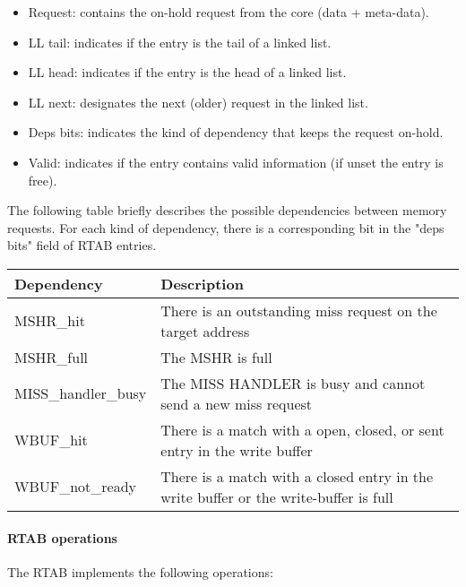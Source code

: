 \documentclass[10pt,titlepage,twoside]{book}
\begin{document}
\begin{itemize}
\item Request: contains the on-hold request from the core (data + meta-data).
\item LL tail: indicates if the entry is the tail of a linked list.
\item LL head: indicates if the entry is the head of a linked list.
\item LL next: designates the next (older) request in the linked list.
\item Deps bits: indicates the kind of dependency that keeps the request on-hold.
\item Valid: indicates if the entry contains valid information (if unset the entry is free).
\end{itemize}

The following table briefly describes the possible dependencies between memory requests.
For each kind of dependency, there is a corresponding bit in the "deps bits" field of \ac{RTAB} entries.

\begin{tabular}{p{.30\linewidth}p{.70\linewidth}}
  \toprule%
  \bf Dependency
  & \bf Description \\
  \midrule%
  MSHR\_hit
  & There is an outstanding miss request on the target address \\
  \midrule%
  MSHR\_full
  & The MSHR is full \\
  \midrule%
  MISS\_handler\_busy
  & The MISS HANDLER is busy and cannot send a new miss request \\
  \midrule%
  WBUF\_hit
  & There is a match with a open, closed, or sent entry in the write buffer \\
  \midrule%
  WBUF\_not\_ready
  & There is a match with a closed entry in the write buffer or the write-buffer is full\\
\end{tabular}

\paragraph{\ac{RTAB} operations}\mbox{}

The \ac{RTAB} implements the following operations:
\end{document}
